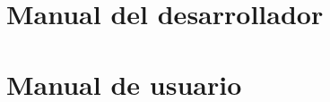 \null\vfill

\appendix

\chapter{Manual del desarrollador}

\newpage{\ }
\cleardoublepage

\chapter{Manual de usuario}

\newpage{\ }
\cleardoublepage

%
    
    